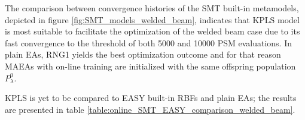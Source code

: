 \begin{table}[h!]
\centering
\caption{Welded beam case with RNG1. Optimal candidate solution 
found using metamodels trained on-line via SMT}
\label{table:online_SMT_welded_beam}
\end{table}

The comparison between convergence histories of the SMT built-in
metamodels, depicted in figure \ref{fig:SMT_models_welded_beam}, 
indicates that KPLS model is most suitable to facilitate the 
optimization of the welded beam case due to its fast convergence to 
the threshold of both 5000 and 10000 PSM evaluations. In plain EAs, 
RNG1 yields the best optimization outcome and for that reason MAEAs 
with on-line training are initialized with the same offspring 
population $P_{λ}^{0}$.

\newpage


KPLS is yet to be compared to EASY built-in RBFs and plain EAs; 
the results are presented in table 
\ref{table:online_SMT_EASY_comparison_welded_beam}.
 
\begin{table}[h!]
\centering
\caption{Welded beam case. Comparison between the outcome of the  
optimization using MAEAs with on-line training and plain EAs}
\label{table:online_SMT_EASY_comparison_welded_beam}
\end{table}

